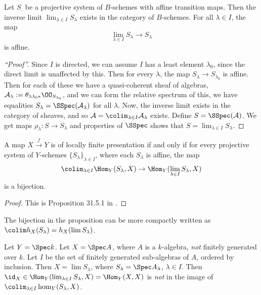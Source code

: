 \documentclass[11pt, english]{article}
\begin{document}
\begin{lemma}
Let $S_.$ be a projective system of $B$-schemes with affine transition maps. Then the inverse limit $\lim_{\lambda \in I} S_\lambda$ exists in the category of $B$-schemes. For all $\lambda \in I$, the map
\[
\lim_{\lambda \in I} S_\lambda \to S_\lambda
\]
is affine.
\end{lemma}
\begin{proof}[``Proof'']
Since $I$ is directed, we can assume $I$ has a least element $\lambda_0$, since the direct limit is unaffected by this. Then for every $\lambda$, the map $S_\lambda \to S_{\lambda_0}$ is affine. Then for each of these we have a quasi-coherent sheaf of algebras, $\mathcal A_\lambda := \theta_{\lambda \lambda_0*}\OO_{S_{\lambda_0}}$, and we can form the relative spectrum of this, we have equalities $S_\lambda = \SSpec(\mathcal A_\lambda)$ for all $\lambda$. Now, the inverse limit exists in the category of sheaves, and so $\mathcal A = \colim_{\lambda \in I} \mathcal A_\lambda$ exists. Define $S =\SSpec(\mathcal A)$. We get maps $\rho_\lambda:S \to S_\lambda$ and properties of $\SSpec$ shows that $S = \lim_{\lambda \in I} S_\lambda$. 
\end{proof}

\begin{prop}[EGA, IV 8.14.2] A map $X \xrightarrow{f} Y$ is of locally finite presentation if and only if for every projective system of $Y$-schemes $\{S_\lambda\}_{\lambda \in I}$, where each $S_\lambda$ is affine, the map
\[
\colim_{\lambda \in I} \Hom_Y(S_\lambda, X)  \to \Hom_Y(\lim_{\lambda \in I} S_\lambda, X)
\]
is a bijection.
\end{prop}
\begin{proof}
This is Proposition 31.5.1 in \cite[Tag 01ZB]{stacks-project}. 
\end{proof}

\begin{remark}The bijection in the proposition can be more compactly written as $\colim h_X(S_\lambda)  = h_X(\lim S_\lambda)$.
\end{remark}

\begin{example}
Let $Y= \Spec k$. Let $X=\Spec A$, where $A$ is a $k$-algebra, \emph{not} finitely generated over $k$. Let $I$ be the set of finitely generated sub-algebras of $A$, ordered by inclusion. Then $X = \lim S_\lambda$, where $S_\lambda = \Spec A_\lambda$, $\lambda \in I$. Then $\id_X \in \Hom_Y(\lim_{\lambda \in I} S_\lambda, X)=\Hom_Y(X,X)$ is \emph{not} in the image of $\colim_{\lambda \in I} \hom_Y(S_\lambda, X)$.
\end{example}
\end{document}

